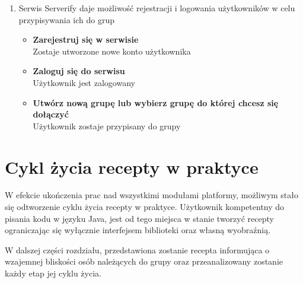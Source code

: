 \documentclass[11pt,a4paper,polish,thesis]{dcsbook}
\begin{document}
\begin{enumerate}
\begin{itemize}
\end{itemize}
\item
Serwis Serverify daje możliwość rejestracji i logowania użytkowników w celu przypisywania ich do grup
\begin{itemize}
\item \textbf{Zarejestruj się w serwisie}\\
Zostaje utworzone nowe konto użytkownika
\item \textbf{Zaloguj się do serwisu}\\
Użytkownik jest zalogowany
\item \textbf{Utwórz nową grupę lub wybierz grupę do której chcesz się dołączyć}\\
Użytkownik zostaje przypisany do grupy
\end{itemize}
\end{enumerate}

\section{Cykl życia recepty w praktyce}
W efekcie ukończenia prac nad wszystkimi modułami platformy, możliwym stało się odtworzenie cyklu życia recepty w praktyce. Użytkownik kompetentny do pisania
kodu w języku Java, jest od tego miejsca w stanie tworzyć recepty ograniczając się wyłącznie interfejsem biblioteki oraz własną wyobraźnią.

W dalszej części rozdziału, przedstawiona zostanie recepta informująca o wzajemnej bliskości osób należących do grupy oraz przeanalizowany zostanie każdy etap
jej cyklu życia.
\end{document}
